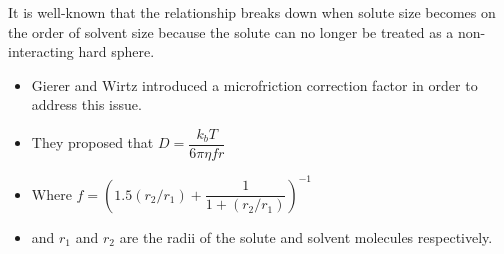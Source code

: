 \documentclass{article}
\begin{document}
  \noindent It is well-known that the relationship breaks down when solute size becomes
  on the order of solvent size because the solute can no longer be treated
  as a non-interacting hard sphere. %
  \begin{itemize}
    \item Gierer and Wirtz introduced a microfriction correction factor in order to 
    address this issue. 
    \item They proposed that $D = \dfrac{k_bT}{6\pi\eta fr}$
    \item Where $f = \left(1.5(r_2/r_1) + \dfrac{1}{1 + (r_2/r_1)}\right)^{-1}$
    \item and $r_1$ and $r_2$ are the radii of the solute and solvent molecules
    respectively.
  \end{itemize}
\end{document}
